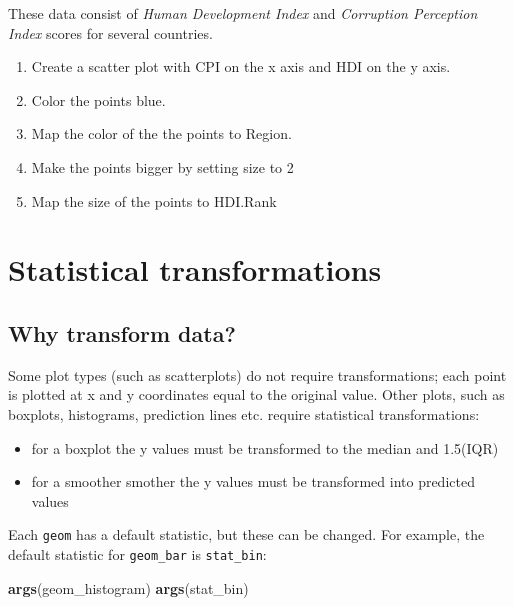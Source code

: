 \documentclass[]{book}
\newenvironment{Shaded}{\begin{snugshade}}{\end{snugshade}}
\newcommand{\KeywordTok}[1]{\textcolor[rgb]{0.13,0.29,0.53}{\textbf{#1}}}
\newcommand{\NormalTok}[1]{#1}
\providecommand{\tightlist}{%
  \setlength{\itemsep}{0pt}\setlength{\parskip}{0pt}}
\begin{document}
These data consist of \emph{Human Development Index} and
\emph{Corruption Perception Index} scores for several countries.

\begin{enumerate}
\def\labelenumi{\arabic{enumi}.}
\tightlist
\item
  Create a scatter plot with CPI on the x axis and HDI on the y axis.
\item
  Color the points blue.
\item
  Map the color of the the points to Region.
\item
  Make the points bigger by setting size to 2
\item
  Map the size of the points to HDI.Rank
\end{enumerate}

\section{Statistical transformations}\label{statistical-transformations}

\subsection{Why transform data?}\label{why-transform-data}

Some plot types (such as scatterplots) do not require transformations;
each point is plotted at x and y coordinates equal to the original
value. Other plots, such as boxplots, histograms, prediction lines etc.
require statistical transformations:

\begin{itemize}
\tightlist
\item
  for a boxplot the y values must be transformed to the median and
  1.5(IQR)
\item
  for a smoother smother the y values must be transformed into predicted
  values
\end{itemize}

Each \texttt{geom} has a default statistic, but these can be changed.
For example, the default statistic for \texttt{geom\_bar} is
\texttt{stat\_bin}:

\begin{Shaded}
\begin{Highlighting}[]
\KeywordTok{args}\NormalTok{(geom_histogram)}
\KeywordTok{args}\NormalTok{(stat_bin)}
\end{Highlighting}
\end{Shaded}
\end{document}
